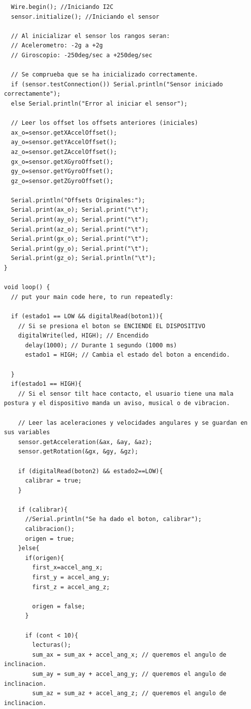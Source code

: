 \begin{lstlisting}
  Wire.begin(); //Iniciando I2C   
  sensor.initialize(); //Iniciando el sensor 

  // Al inicializar el sensor los rangos seran: 
  // Acelerometro: -2g a +2g 
  // Giroscopio: -250deg/sec a +250deg/sec 

  // Se comprueba que se ha inicializado correctamente.   
  if (sensor.testConnection()) Serial.println("Sensor iniciado correctamente"); 
  else Serial.println("Error al iniciar el sensor"); 

  // Leer los offset los offsets anteriores (iniciales)
  ax_o=sensor.getXAccelOffset(); 
  ay_o=sensor.getYAccelOffset(); 
  az_o=sensor.getZAccelOffset(); 
  gx_o=sensor.getXGyroOffset(); 
  gy_o=sensor.getYGyroOffset(); 
  gz_o=sensor.getZGyroOffset(); 
  
  Serial.println("Offsets Originales:"); 
  Serial.print(ax_o); Serial.print("\t");  
  Serial.print(ay_o); Serial.print("\t");  
  Serial.print(az_o); Serial.print("\t");  
  Serial.print(gx_o); Serial.print("\t");  
  Serial.print(gy_o); Serial.print("\t"); 
  Serial.print(gz_o); Serial.println("\t"); 
}

void loop() {
  // put your main code here, to run repeatedly:

  if (estado1 == LOW && digitalRead(boton1)){
    // Si se presiona el boton se ENCIENDE EL DISPOSITIVO
    digitalWrite(led, HIGH); // Encendido
      delay(1000); // Durante 1 segundo (1000 ms)
      estado1 = HIGH; // Cambia el estado del boton a encendido.
    
  }
  if(estado1 == HIGH){
    // Si el sensor tilt hace contacto, el usuario tiene una mala postura y el dispositivo manda un aviso, musical o de vibracion.
    
    // Leer las aceleraciones y velocidades angulares y se guardan en sus variables 
    sensor.getAcceleration(&ax, &ay, &az); 
    sensor.getRotation(&gx, &gy, &gz);

    if (digitalRead(boton2) && estado2==LOW){
      calibrar = true;
    }

    if (calibrar){
      //Serial.println("Se ha dado el boton, calibrar"); 
      calibracion();
      origen = true;
    }else{
      if(origen){
        first_x=accel_ang_x;
        first_y = accel_ang_y;
        first_z = accel_ang_z;

        origen = false;
      }

      if (cont < 10){
        lecturas();
        sum_ax = sum_ax + accel_ang_x; // queremos el angulo de inclinacion.
        sum_ay = sum_ay + accel_ang_y; // queremos el angulo de inclinacion.
        sum_az = sum_az + accel_ang_z; // queremos el angulo de inclinacion.


\end{lstlisting}
